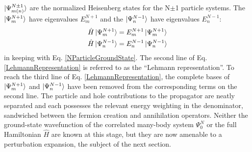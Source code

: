 $\ket{\Psi^{N\pm1}_{m(n)}}$ are the normalized Heisenberg states for the N$\pm$1 particle 
systems. The $\ket{\Psi^{N+1}_{m}}$ have eigenvalues $E^{N+1}_{m}$ and the
$\ket{\Psi^{N-1}_{n}}$ have 
eigenvalues $E^{N-1}_{n}$:
\begin{equation}
    \begin{split}
        \hat{H}\ket{\Psi^{N+1}_{m}} & = E^{N+1}_{m}\ket{\Psi^{N+1}_{m}}\\
        \hat{H}\ket{\Psi^{N-1}_{n}} & = E^{N-1}_{n}\ket{\Psi^{N-1}_{n}}
    \end{split}
\end{equation}
in keeping with Eq. \ref{NParticleGroundState}. The second line
of Eq. \ref{LehmannRepresentation} is referred to as the ``Lehmann representation''.
To reach the third line of Eq. \ref{LehmannRepresentation}, the complete bases of
$\ket{\Psi^{N+1}_{m}}$ and $\ket{\Psi^{N-1}_{n}}$ have been removed from the
corresponding terms on the second line.
The particle and hole contributions to the propagator are neatly separated and
each possesses the relevant energy weighting in the denominator, sandwiched between the fermion 
creation and annihilation operators. Neither the ground-state wavefunction of the correlated
many-body system $\Psi^{N}_{0}$ or the full Hamiltonian $\hat{H}$ are known at this stage, but they
are now amenable to a perturbation expansion, the subject of the next section.

